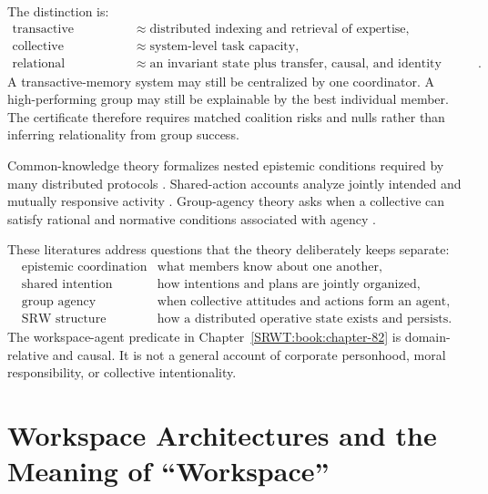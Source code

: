 The distinction is:
\[
\begin{aligned}
\text{transactive memory}
&\approx
\text{distributed indexing and retrieval of expertise},\\
\text{collective intelligence}
&\approx
\text{system-level task capacity},\\
\text{relational workspace}
&\approx
\text{an invariant state plus transfer, causal, and identity structure}.
\end{aligned}
\]
A transactive-memory system may still be centralized by one coordinator. A
high-performing group may still be explainable by the best individual member.
The certificate therefore requires matched coalition risks and nulls
rather than inferring relationality from group success.


Common-knowledge theory formalizes nested epistemic conditions required by
many distributed protocols \cite{SRWT:HalpernMoses1990,SRWT:FaginEtAl1995}. Shared-action
accounts analyze jointly intended and mutually responsive activity
\cite{SRWT:Bratman1992}. Group-agency theory asks when a collective can satisfy
rational and normative conditions associated with agency
\cite{SRWT:ListPettit2011}.

These literatures address questions that the theory deliberately keeps
separate:
\[
\begin{array}{ll}
\text{epistemic coordination} & \text{what members know about one another},\\
\text{shared intention} & \text{how intentions and plans are jointly organized},\\
\text{group agency} & \text{when collective attitudes and actions form an agent},\\
\text{SRW structure} & \text{how a distributed operative state exists and persists}.
\end{array}
\]
The workspace-agent predicate in Chapter~\ref{SRWT:book:chapter-82} is domain-relative and causal. It is
not a general account of corporate personhood, moral responsibility, or
collective intentionality.

\section{Workspace Architectures and the Meaning of ``Workspace''}


